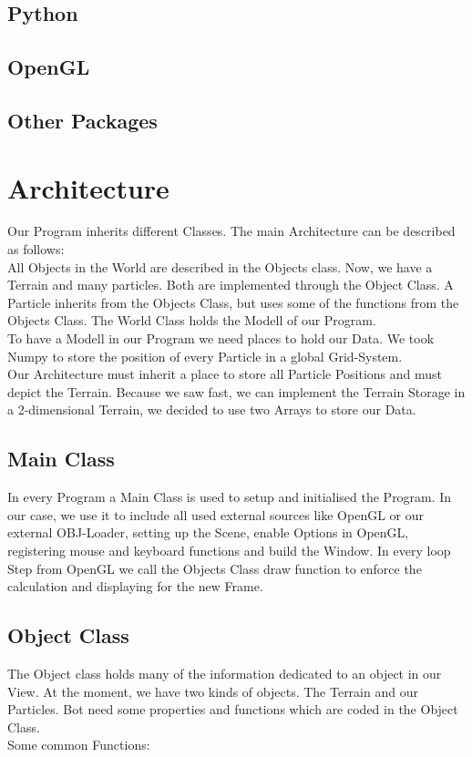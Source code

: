 \documentclass{sig-alternate-05-2015}
\begin{document}
\subsection{Python}
\subsection{OpenGL}
\subsection{Other Packages}
\section{Architecture}
Our Program inherits different Classes. The main Architecture can be described as follows:\\
All Objects in the World are described in the Objects class. Now, we have a Terrain and many particles. Both are implemented through the Object Class. A Particle inherits from the Objects Class, but uses some of the functions from the Objects Class. The World Class holds the Modell of our Program. \\
To have a Modell in our Program we need places to hold our Data. We took Numpy to store the position of every Particle in a global Grid-System.\\
Our Architecture must inherit a place to store all Particle Positions and must depict the Terrain. Because we saw fast, we can implement the Terrain Storage in a 2-dimensional Terrain, we decided to use two Arrays to store our Data. \\
\subsection{Main Class}
In every Program a Main Class is used to setup and initialised the Program. In our case, we use it to include all used external sources like OpenGL or our external OBJ-Loader, setting up the Scene, enable Options in OpenGL, registering mouse and keyboard functions and build the Window. In every loop Step from OpenGL we call the Objects Class draw function to enforce the calculation and displaying for the new Frame.
\subsection{Object Class}
The Object class holds many of the information dedicated to an object in our View. At the moment, we have two kinds of objects. The Terrain and our Particles. Bot need some properties and functions which are coded in the Object Class. \\
Some common Functions:\\
\end{document}
